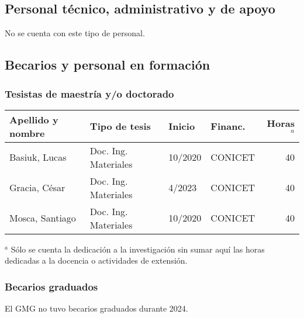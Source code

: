 \documentclass[a4paper,11pt,twoside,final,titlepage,onecolumn,openright]{report}
\begin{document}
\subsection{Personal técnico, administrativo y de apoyo}
No se cuenta con este tipo de personal.


\subsection{Becarios y personal en formación}

\subsubsection{Tesistas de maestría y/o doctorado}
\begin{tabular}{l l l l r}
\toprule
Apellido y nombre & Tipo de tesis & Inicio & Financ. & Horas$^a$ \\
\midrule
Basiuk, Lucas & Doc. Ing. Materiales & 10/2020 &  CONICET & 40 \\
Gracia, César & Doc. Ing. Materiales & 4/2023 &  CONICET & 40 \\
Mosca, Santiago & Doc. Ing. Materiales & 10/2020 &  CONICET & 40\\
\bottomrule
\end{tabular}

\normalsize
\vspace{0.5cm}
$^a$ Sólo se cuenta la dedicación a la investigación sin sumar aquí las horas dedicadas a la docencia o actividades de extensión.

\subsubsection{Becarios graduados}

El GMG no tuvo becarios graduados durante 2024.
%
\end{document}
